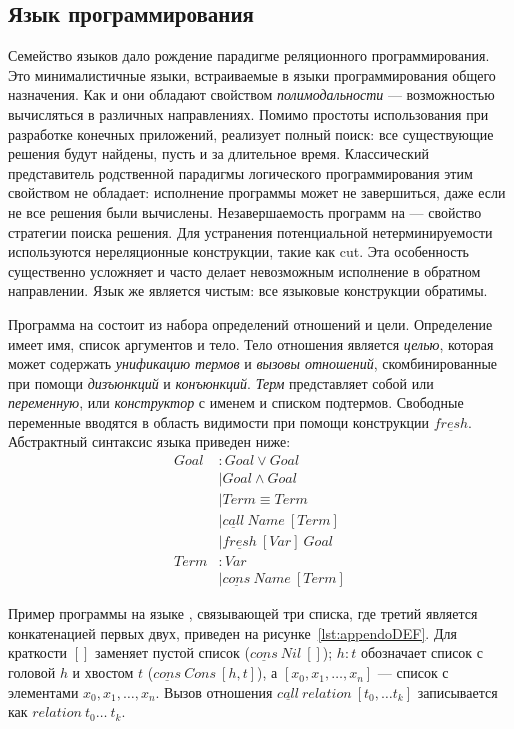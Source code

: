 \subsection{Язык программирования \miniKanren{}}

Семейство языков \miniKanren{} дало рождение парадигме реляционного программирования. 
Это минималистичные языки, встраиваемые в языки программирования общего назначения. 
Как и \prolog{} они обладают свойством \emph{полимодальности} --- возможностью вычисляться в различных направлениях.
Помимо простоты использования при разработке конечных приложений, \miniKanren{} реализует полный поиск: все существующие решения будут найдены, пусть и за длительное время.
Классический представитель родственной парадигмы логического программирования \prolog{} этим свойством не обладает: исполнение программы может не завершиться, даже если не все решения были вычислены. 
Незавершаемость программ на \prolog{} --- свойство стратегии поиска решения.
Для устранения потенциальной нетерминируемости используются нереляционные конструкции, такие как cut. 
Эта особенность существенно усложняет и часто делает невозможным исполнение в обратном направлении. 
Язык \miniKanren{} же является чистым: все языковые конструкции обратимы. 

Программа на \miniKanren{} состоит из набора определений отношений и цели. 
Определение имеет имя, список аргументов и тело.
Тело отношения является \textit{целью}, которая может содержать \textit{унификацию термов} и \textit{вызовы отношений}, скомбинированные при помощи \textit{дизъюнкций} и \textit{конъюнкций}. 
\textit{Терм} представляет собой или \textit{переменную}, или \textit{конструктор} с именем и списком подтермов. 
Свободные переменные вводятся в область видимости при помощи конструкции $\underline{fresh}$. 
Абстрактный синтаксис языка приведен ниже:
\begin{align*}
  Goal &: Goal \vee Goal \\
       &\mid Goal \wedge Goal \\
       &\mid Term \equiv Term \\
       &\mid \underline{call} \ Name \ [Term] \\
       &\mid \underline{fresh} \ [Var] \ Goal \\
  Term &: Var \\ 
       &\mid \underline{cons} \ Name \ [Term]
\end{align*}

Пример программы на языке \miniKanren{}, связывающей три списка, где третий является конкатенацией первых двух, приведен на рисунке~\ref{lst:appendoDEF}. 
Для краткости $[]$ заменяет пустой список ($\underline{cons} \ Nil \ []$); $h : t$ обозначает список с головой $h$ и хвостом $t$ ($\underline{cons} \ Cons \ [h, t]$), а $[x_0, x_1, \dots, x_n]$ --- список с элементами $x_0, x_1, \dots, x_n$. 
Вызов отношения $\underline{call} \ relation \ [t_0, \dots t_k]$ записывается как $relation \ t_0 \dots \ t_k$.

